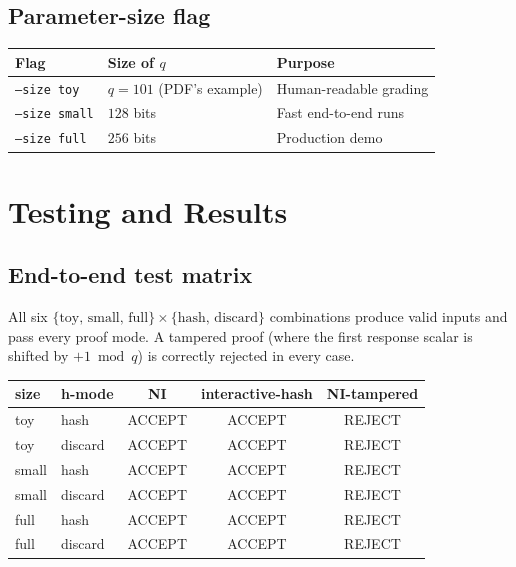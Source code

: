\documentclass[11pt,a4paper]{article}
\begin{document}
\subsection{Parameter-size flag}

\begin{center}
\begin{tabular}{lll}
\toprule
\textbf{Flag} & \textbf{Size of $q$} & \textbf{Purpose} \\
\midrule
\texttt{--size toy}   & $q=101$ (PDF's example)       & Human-readable grading \\
\texttt{--size small} & $128$ bits                    & Fast end-to-end runs \\
\texttt{--size full}  & $256$ bits                    & Production demo \\
\bottomrule
\end{tabular}
\end{center}

\section{Testing and Results}

\subsection{End-to-end test matrix}

All six $\{\text{toy, small, full}\}\times\{\text{hash, discard}\}$
combinations produce valid inputs and pass every proof mode. A tampered
proof (where the first response scalar is shifted by $+1 \bmod q$) is
correctly rejected in every case.

\begin{center}
\begin{tabular}{llccc}
\toprule
\textbf{size} & \textbf{h-mode} & \textbf{NI} & \textbf{interactive-hash} & \textbf{NI-tampered} \\
\midrule
toy   & hash    & ACCEPT & ACCEPT & REJECT \\
toy   & discard & ACCEPT & ACCEPT & REJECT \\
small & hash    & ACCEPT & ACCEPT & REJECT \\
small & discard & ACCEPT & ACCEPT & REJECT \\
full  & hash    & ACCEPT & ACCEPT & REJECT \\
full  & discard & ACCEPT & ACCEPT & REJECT \\
\bottomrule
\end{tabular}
\end{center}
\end{document}
